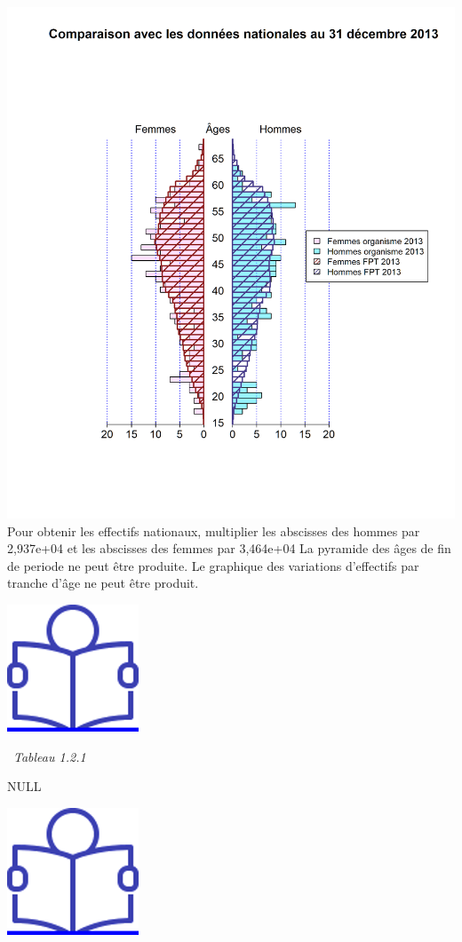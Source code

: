 \includegraphics{altair_files/figure-latex/unnamed-chunk-11-2.png} Pour
obtenir les effectifs nationaux, multiplier les abscisses des hommes par
2,937e+04 et les abscisses des femmes par 3,464e+04 La pyramide des âges
de fin de periode ne peut être produite. \newpage Le graphique des
variations d'effectifs par tranche d'âge ne peut être produit.

\href{../Docs/Notices/fiche_3.odt}{\includegraphics{icones/Notice.png}}

\newpage

~\emph{Tableau 1.2.1}

NULL

\href{../Docs/Notices/fiche_1.odt}{\includegraphics{icones/Notice.png}}

